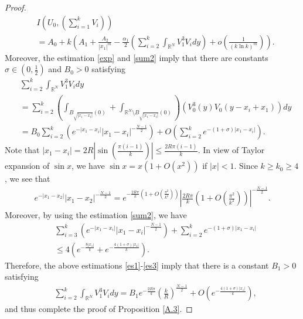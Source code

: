 \documentclass{amsart}
\theoremstyle{definition}
\theoremstyle{remark}
\numberwithin{equation}{section}
\begin{document}
\begin{proof}
\begin{equation}
\begin{aligned}
&I\left(U_0, \left( \sum_{i=1}^k V_{i}\right)\right)  
\\& = A_0+ 
 k\left(A_1+\frac{A_2}{\left|x_{1}\right|^{m}}-\frac{\alpha_1}{2} \left( \sum_{i=2}^{k} \int_{\mathbb{R}^{N}} V_1^{3} V_idy\right)+o\left(\frac{1}{(k\ln k)^m}\right)\right).
\end{aligned}
\end{equation}
Moreover, the estimation \eqref{exp}  and \eqref{sum2} imply that there are constants $\sigma\in(0,\frac{1}{2})$ and ${B}_{0}>0$ satisfying 
\begin{equation}
\begin{aligned}\label{es1}
&\sum_{i=2}^{k} \int_{\mathbb{R}^{N}} V_1^{3} V_idy
\\&=\sum_{i=2}^{k}\left( \int_{B_{\sqrt{|x_1-x_i|}}(0)} +\int_{\mathbb{R}^{N}\setminus B_{\sqrt{|x_1-x_i|}}(0)} \right)\left(V_0^{3}(y) V_0(y-x_i+x_1)\right)dy
\\&={B}_{0} \sum_{i=2}^{k} \left(e^{-\left|x_{1}-x_{i}\right|}|x_1-x_i|^{-\frac{N-1}{2}}\right)+O\left(\sum_{i=2}^{k} e^{-(1+\sigma)\left|x_{1}-x_{i}\right|}\right).\end{aligned}
\end{equation}
Note that $|x_1-x_i|=2R \left|\sin\left(\frac{\pi (i-1)}{k}\right)\right|\le \frac{2R\pi(i-1)}{k}$. In view of Taylor expansion of $\sin x$, we have $\sin x= x\left(1+O(x^2)\right)$ if $|x|<1$. Since $k\ge k_0\ge 4$, we see that   
\begin{equation}\label{es2}\begin{aligned}  e^{-\left|x_{1}-x_{2}\right|}|x_1-x_2|^{-\frac{N-1}{2}}= e^{-\frac{2R\pi}{k}\left(1+O\left(\frac{\pi^2}{k^2}\right)\right)}\left|\frac{2R\pi}{k}\left(1+O\left(\frac{\pi^2}{k^2}\right)\right)\right|^{-\frac{N-1}{2}}.\end{aligned}\end{equation}
Moreover, by using the estimation \eqref{sum2}, we have 
\begin{equation}\label{es3}\begin{aligned}&\sum_{i=3}^{k} \left(e^{-\left|x_{1}-x_{i}\right|}|x_1-x_i|^{-\frac{N-1}{2}}\right)+\sum_{i=2}^{k} e^{-(1+\sigma)\left|x_{1}-x_{i}\right|}\\& \le 4 \left(e^{-\frac{8|x_1|}{k}} + e^{-\frac{4(1+\sigma)|x_1|}{k}}\right).\end{aligned}\end{equation} 
Therefore,  the above estimations \eqref{es1}-\eqref{es3} imply that there is a constant $B_1>0$ satisfying  \begin{equation}
\begin{aligned}
&\sum_{i=2}^{k} \int_{\mathbb{R}^{N}} V_1^{3} V_idy = {B}_{1} e^{-\frac{2R\pi}{k}}\left(\frac{k}{R}\right)^{\frac{N-1}{2}}+O\left(e^{-\frac{4(1+\sigma)\left|x_{1}\right|}{k}}\right),
\end{aligned}
\end{equation}and thus complete the proof of  Proposition \ref{A.3}.
\end{proof}
\end{document}
